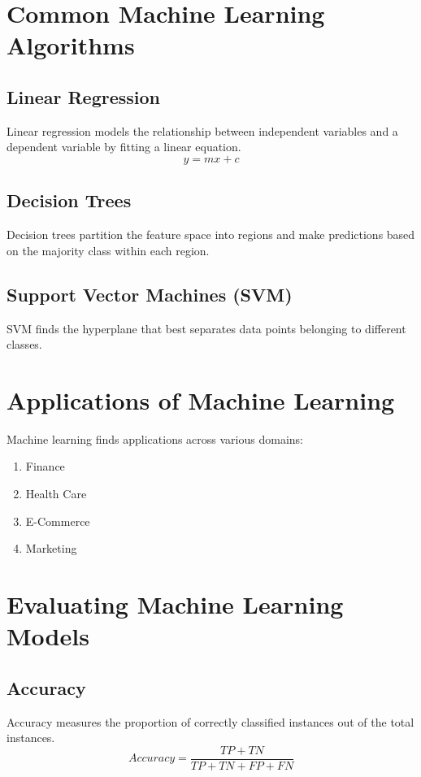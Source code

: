 \documentclass{article}
\begin{document}
	\section{Common Machine Learning Algorithms}
	\subsection{Linear Regression}
	Linear regression models the relationship between independent variables and a dependent variable by fitting a linear equation.
	\begin{equation} 
		y = {mx+c}
	\end{equation}
	\subsection{Decision Trees}
	Decision trees partition the feature space into regions and make predictions based on the majority class within each region.
	\subsection{Support Vector Machines (SVM)}
	SVM finds the hyperplane that best separates data points belonging to different classes.
	
	\section{Applications of Machine Learning}
	Machine learning finds applications across various domains:
	\begin{enumerate}
		\item Finance
		\item Health Care
		\item E-Commerce
		\item Marketing
	\end{enumerate}
	
	\section{Evaluating Machine Learning Models}
	\subsection{Accuracy}
	Accuracy measures the proportion of correctly classified instances out of the total instances.
	\begin{equation}
		Accuracy = {\frac{TP+TN}{TP+TN+FP+FN}}
	\end{equation}
\end{document}
